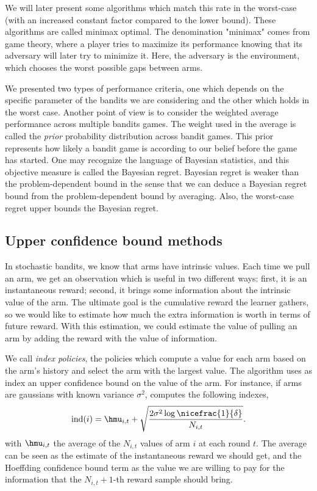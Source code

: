 {We will later present some algorithms which match this rate in the worst-case (with an increased constant factor compared to the lower bound). These algorithms are called minimax optimal.  The denomination "minimax" comes from game theory, where a player tries to maximize its performance knowing that its adversary will later try to minimize it. Here, the adversary is the environment, which chooses the worst possible gaps between arms. 

We presented two types of performance criteria, one which depends on the specific parameter of the bandits we are considering and the other which holds in the worst case. Another point of view is to consider the weighted average performance across multiple bandits games. The weight used in the average is called the \emph{prior} probability distribution across bandit games. This prior represents how likely a bandit game is according to our belief before the game has started. One may recognize the language of Bayesian statistics, and this objective measure is called the Bayesian regret. Bayesian regret is weaker than the problem-dependent bound in the sense that we can deduce a Bayesian regret bound from the problem-dependent bound by averaging. Also, the worst-case regret upper bounds the Bayesian regret.


\subsection{Upper confidence bound methods}
In stochastic bandits, we know that arms have intrinsic values. Each time we pull an arm, we get an observation which is useful in two different ways: first, it is an instantaneous reward; second, it brings some information about the intrinsic value of the arm. The ultimate goal is the cumulative reward the learner gathers, so we would like to estimate how much the extra information is worth in terms of future reward. With this estimation, we could estimate the value of pulling an arm by adding the reward with the value of information. 

We call \emph{index policies}, the policies which compute a value for each arm based on the arm's history and select the arm with the largest value. The \UCB algorithm uses as index an upper confidence bound on the value of the arm. For instance, if arms are gaussians with known variance $\sigma^2$, \UCB computes the following indexes,
\begin{equation}
\label{eq:ucb}
\text{ind}(i) = \hmu_{i,t} + \sqrt{\frac{2\sigma^2 \log{\nicefrac{1}{\delta}}}{N_{i,t}}}.
\end{equation}
with $\hmu_{i,t}$ the average of the $N_{i,t}$ values of arm $i$ at each round $t$.  The average can be seen as the estimate of the instantaneous reward we should get, and the Hoeffding confidence bound term as the value we are willing to pay for the information that the $N_{i,t}+1$-th reward sample should bring. 

}
